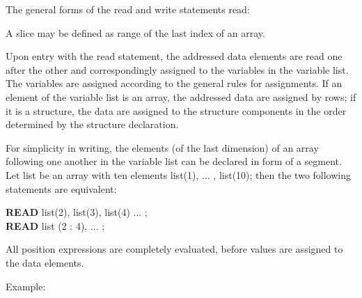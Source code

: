 The general forms of the read and write statements read:




A slice may be defined as range of the last index of an array.










Upon entry with the read statement, the addressed data elements are
read one after the other and correspondingly assigned to the variables
in the variable list. The variables are assigned according to the
general rules for assignments. If an element of the variable list is an
array, the addressed data are assigned by rows; if it is a structure, the
data are assigned to the structure components in the order determined by
the structure declaration.

For simplicity in writing, the elements (of the last dimension) of an
array following one another in the variable list can be declared in form
of a segment. Let list be an array with ten elements list(1), ... ,
list(10); then the two following statements are equivalent:

{\bf READ} list(2), list(3), list(4) ... ;\\
{\bf READ} list (2 : 4), ... ;

All position expressions are completely evaluated, before values are
assigned to the data elements.

Example:

